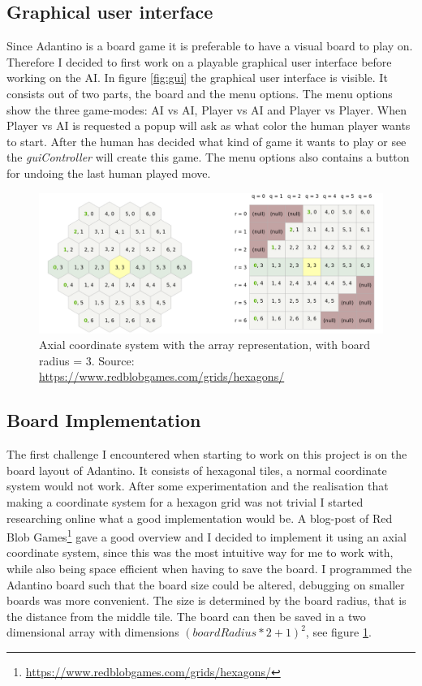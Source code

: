 \documentclass{article}
\begin{document}
\subsection{Graphical user interface}
Since Adantino is a board game it is preferable to have a visual board to play on. Therefore I decided to first work on a playable graphical user interface before working on the AI. In figure \ref{fig:gui} the graphical user interface is visible. It consists out of two parts, the board and the menu options. The menu options show the three game-modes: AI vs AI, Player vs AI and Player vs Player. When Player vs AI is requested a popup will ask as what color the human player wants to start. After the human has decided what kind of game it wants to play or see the \textit{guiController} will create this game. The menu options also contains a button for undoing the last human played move.

\begin{figure}[ht]
    \centering
    \includegraphics[width = \textwidth]{images/axial-System.png}
    \caption{Axial coordinate system with the array representation, with board radius = 3. Source: \url{https://www.redblobgames.com/grids/hexagons/}}
    \label{fig:axial}
\end{figure}

\subsection{Board Implementation}
The first challenge I encountered when starting to work on this project is on the board layout of Adantino. It consists of hexagonal tiles, a normal coordinate system would not work. After some experimentation and the realisation that making a coordinate system for a hexagon grid was not trivial I started researching online what a good implementation would be. A blog-post of Red Blob Games\footnote{\url{https://www.redblobgames.com/grids/hexagons/}} gave a good overview and I decided to implement it using an axial coordinate system, since this was the most intuitive way for me to work with, while also being space efficient when having to save the board. I programmed the Adantino board such that the board size could be altered, debugging on smaller boards was more convenient. The size is determined by the board radius, that is the distance from the middle tile. The board can then be saved in a two dimensional array with dimensions $(boardRadius*2+1)^2$, see figure \ref{fig:axial}.  
\end{document}
